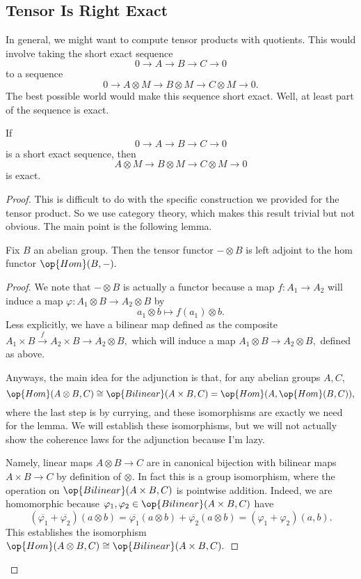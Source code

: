 \subsection{Tensor Is Right Exact}
In general, we might want to compute tensor products with quotients. This would involve taking the short exact sequence
\[0\to A\to B\to C\to 0\]
to a sequence
\[0\to A\otimes M\to B\otimes M\to C\otimes M\to0.\]
The best possible world would make this sequence short exact. Well, at least part of the sequence is exact.
\begin{theorem} \label{prop:tensorrightexact}
	If
	\[0\to A\to B\to C\to0\]
	is a short exact sequence, then
	\[A\otimes M\to B\otimes M\to C\otimes M\to0\]
	is exact.
\end{theorem}
\begin{proof}
	This is difficult to do with the specific construction we provided for the tensor product. So we use category theory, which makes this result trivial but not obvious. The main point is the following lemma.
	\begin{lemma} \label{lem:tensorisleft}
		Fix $B$ an abelian group. Then the tensor functor $-\otimes B$ is left adjoint to the hom functor $\op{Hom}(B,-).$
	\end{lemma}
	\begin{proof}
		We note that $-\otimes B$ is actually a functor because a map $f:A_1\to A_2$ will induce a map $\varphi:A_1\otimes B\to A_2\otimes B$ by
		\[a_1\otimes b\mapsto f(a_1)\otimes b.\]
		Less explicitly, we have a bilinear map defined as the composite $A_1\times B\stackrel f\to A_2\times B\to A_2\otimes B,$ which will induce a map $A_1\otimes B\to A_2\otimes B,$ defined as above.

		Anyways, the main idea for the adjunction is that, for any abelian groups $A,C,$
		\[\op{Hom}(A\otimes B,C)\cong\op{Bilinear}(A\times B,C)=\op{Hom}(A,\op{Hom}(B,C)),\]
		where the last step is by currying, and these isomorphisms are exactly we need for the lemma. We will establish these isomorphisms, but we will not actually show the coherence laws for the adjunction because I'm lazy.
		
		Namely, linear maps $A\otimes B\to C$ are in canonical bijection with bilinear maps $A\times B\to C$ by definition of $\otimes.$ In fact this is a group isomorphism, where the operation on $\op{Bilinear}(A\times B,C)$ is pointwise addition. Indeed, we are homomorphic because $\varphi_1,\varphi_2\in\op{Bilinear}(A\times B,C)$ have
		\[(\overline{\varphi_1}+\overline{\varphi_2})(a\otimes b)=\overline{\varphi_1}(a\otimes b)+\overline{\varphi_2}(a\otimes b)=(\varphi_1+\varphi_2)(a,b).\]
		This establishes the isomorphism $\op{Hom}(A\otimes B,C)\cong\op{Bilinear}(A\times B,C).$


\end{proof}
\end{proof}
